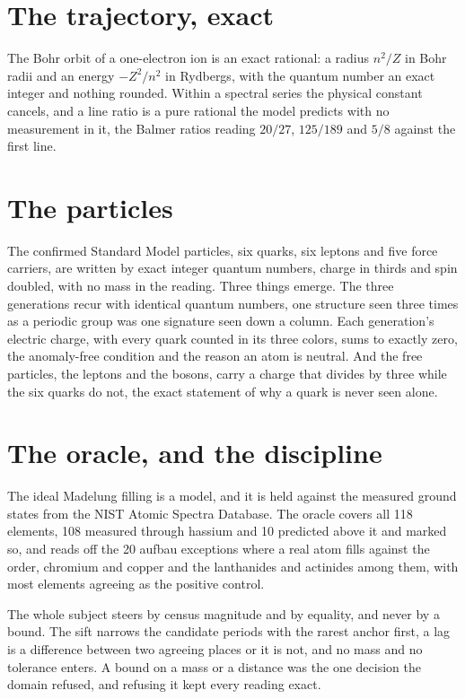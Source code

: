 \section{The trajectory, exact}

The Bohr orbit of a one-electron ion is an exact rational: a radius $n^2/Z$ in Bohr radii and an energy
$-Z^2/n^2$ in Rydbergs, with the quantum number an exact integer and nothing rounded. Within a spectral
series the physical constant cancels, and a line ratio is a pure rational the model predicts with no
measurement in it, the Balmer ratios reading $20/27$, $125/189$ and $5/8$ against the first line.

\section{The particles}

The confirmed Standard Model particles, six quarks, six leptons and five force carriers, are written by
exact integer quantum numbers, charge in thirds and spin doubled, with no mass in the reading. Three
things emerge. The three generations recur with identical quantum numbers, one structure seen three
times as a periodic group was one signature seen down a column. Each generation's electric charge, with
every quark counted in its three colors, sums to exactly zero, the anomaly-free condition and the reason
an atom is neutral. And the free particles, the leptons and the bosons, carry a charge that divides by
three while the six quarks do not, the exact statement of why a quark is never seen alone.

\section{The oracle, and the discipline}

The ideal Madelung filling is a model, and it is held against the measured ground states from the NIST
Atomic Spectra Database. The oracle covers all 118 elements, 108 measured through hassium and 10
predicted above it and marked so, and reads off the 20 aufbau exceptions where a real atom fills against
the order, chromium and copper and the lanthanides and actinides among them, with most elements agreeing
as the positive control.

The whole subject steers by census magnitude and by equality, and never by a bound. The sift narrows the
candidate periods with the rarest anchor first, a lag is a difference between two agreeing places or it
is not, and no mass and no tolerance enters. A bound on a mass or a distance was the one decision the
domain refused, and refusing it kept every reading exact.
